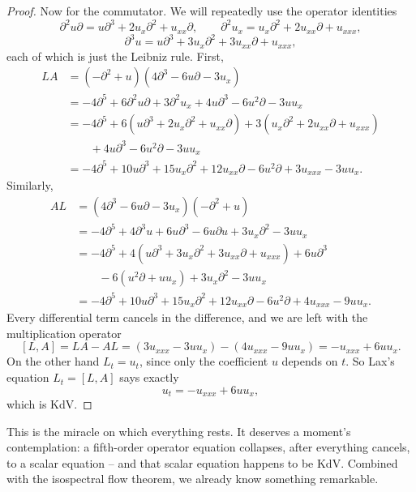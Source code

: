 \documentclass[a4paper]{scrartcl}
\begin{document}
\begin{proof}
	Now for the commutator. We will repeatedly use the operator identities
	$$
	\partial^2 u\partial = u\partial^3 + 2u_x\partial^2 + u_{xx}\partial, \qquad
	\partial^2 u_x = u_x\partial^2 + 2u_{xx}\partial + u_{xxx},
	$$
	$$
	\partial^3 u = u\partial^3 + 3u_x\partial^2 + 3u_{xx}\partial + u_{xxx},
	$$
	each of which is just the Leibniz rule. First,
	\begin{align*}
		LA &= \left(-\partial^2 + u\right)\left(4\partial^3 - 6u\partial - 3u_x\right)\\
		&= -4\partial^5 + 6\partial^2u\partial + 3\partial^2u_x + 4u\partial^3 - 6u^2\partial - 3uu_x\\
		&= -4\partial^5 + 6\left(u\partial^3 + 2u_x\partial^2 + u_{xx}\partial\right) + 3\left(u_x\partial^2 + 2u_{xx}\partial + u_{xxx}\right)\\
		&\qquad + 4u\partial^3 - 6u^2\partial - 3uu_x\\
		&= -4\partial^5 + 10u\partial^3 + 15u_x\partial^2 + 12u_{xx}\partial - 6u^2\partial + 3u_{xxx} - 3uu_x.
	\end{align*}
	Similarly,
	\begin{align*}
		AL &= \left(4\partial^3 - 6u\partial - 3u_x\right)\left(-\partial^2 + u\right)\\
		&= -4\partial^5 + 4\partial^3u + 6u\partial^3 - 6u\partial u + 3u_x\partial^2 - 3uu_x\\
		&= -4\partial^5 + 4\left(u\partial^3 + 3u_x\partial^2 + 3u_{xx}\partial + u_{xxx}\right) + 6u\partial^3\\
		&\qquad - 6\left(u^2\partial + uu_x\right) + 3u_x\partial^2 - 3uu_x\\
		&= -4\partial^5 + 10u\partial^3 + 15u_x\partial^2 + 12u_{xx}\partial - 6u^2\partial + 4u_{xxx} - 9uu_x.
	\end{align*}
	Every differential term cancels in the difference, and we are left with the multiplication operator
	$$
	[L,A] = LA - AL = \left(3u_{xxx} - 3uu_x\right) - \left(4u_{xxx} - 9uu_x\right) = -u_{xxx} + 6uu_x.
	$$
	On the other hand $L_t = u_t$, since only the coefficient $u$ depends on $t$. So Lax's equation $L_t = [L,A]$ says exactly
	$$
	u_t = -u_{xxx} + 6uu_x,
	$$
	which is KdV.
\end{proof}

This is the miracle on which everything rests. It deserves a moment's contemplation: a fifth-order operator equation collapses, after everything cancels, to a scalar equation -- and that scalar equation happens to be KdV. Combined with the isospectral flow theorem, we already know something remarkable.
\end{document}
